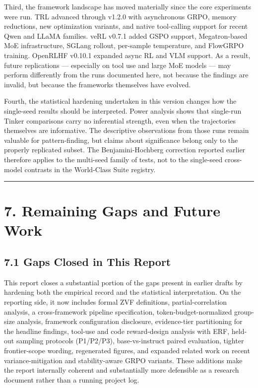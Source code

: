 \documentclass[
  american,
  11pt,
  a4paper,
  oneside]{report}
\begin{document}
Third, the framework landscape has moved materially since the core
experiments were run. TRL advanced through v1.2.0 with asynchronous
GRPO, memory reductions, new optimization variants, and native
tool-calling support for recent Qwen and LLaMA families. veRL v0.7.1
added GSPO support, Megatron-based MoE infrastructure, SGLang rollout,
per-sample temperature, and FlowGRPO training. OpenRLHF v0.10.1 expanded
async RL and VLM support. As a result, future replications ---
especially on tool use and large MoE models --- may perform differently
from the runs documented here, not because the findings are invalid, but
because the frameworks themselves have evolved.

Fourth, the statistical hardening undertaken in this version changes how
the single-seed results should be interpreted. Power analysis shows that
single-run Tinker comparisons carry no inferential strength, even when
the trajectories themselves are informative. The descriptive
observations from those runs remain valuable for pattern-finding, but
claims about significance belong only to the properly replicated subset.
The Benjamini-Hochberg correction reported earlier therefore applies to
the multi-seed family of tests, not to the single-seed cross-model
contrasts in the World-Class Suite registry.

\begin{center}\rule{0.5\linewidth}{0.5pt}\end{center}

\chapter{7. Remaining Gaps and Future
Work}\label{remaining-gaps-and-future-work}

\section{7.1 Gaps Closed in This
Report}\label{gaps-closed-in-this-report}

This report closes a substantial portion of the gaps present in earlier
drafts by hardening both the empirical record and the statistical
interpretation. On the reporting side, it now includes formal ZVF
definitions, partial-correlation analysis, a cross-framework pipeline
specification, token-budget-normalized group-size analysis, framework
configuration disclosure, evidence-tier partitioning for the headline
findings, tool-use and code reward-design analysis with ERF, held-out
sampling protocols (P1/P2/P3), base-vs-instruct paired evaluation,
tighter frontier-scope wording, regenerated figures, and expanded
related work on recent variance-mitigation and stability-aware GRPO
variants. These additions make the report internally coherent and
substantially more defensible as a research document rather than a
running project log.
\end{document}
